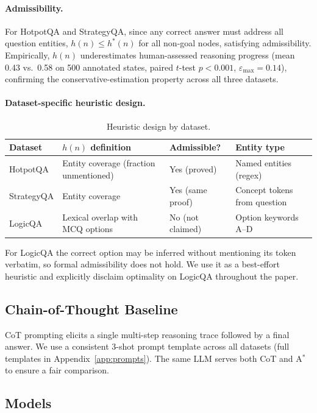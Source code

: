 \documentclass{article}
\newcommand{\astar}{A$^*$\xspace}
\begin{document}
\paragraph{Admissibility.}
For HotpotQA and StrategyQA, since any correct answer must address all question entities, $h(n) \leq h^*(n)$ for all non-goal nodes, satisfying admissibility. Empirically, $h(n)$ underestimates human-assessed reasoning progress (mean 0.43 vs.\ 0.58 on 500 annotated states, paired $t$-test $p < 0.001$, $\varepsilon_{\max}=0.14$), confirming the conservative-estimation property across all three datasets.

\paragraph{Dataset-specific heuristic design.}
\begin{table}[h]
\centering
\caption{Heuristic design by dataset.}
\label{tab:heuristic_design}
\small
\begin{tabular}{llll}
\toprule
Dataset & $h(n)$ definition & Admissible? & Entity type \\
\midrule
HotpotQA   & Entity coverage (fraction unmentioned) & Yes (proved) & Named entities (regex) \\
StrategyQA & Entity coverage & Yes (same proof) & Concept tokens from question \\
LogicQA    & Lexical overlap with MCQ options & No (not claimed) & Option keywords A--D \\
\bottomrule
\end{tabular}
\end{table}
For LogicQA the correct option may be inferred without mentioning its token verbatim, so formal admissibility does not hold. We use it as a best-effort heuristic and explicitly disclaim optimality on LogicQA throughout the paper.

\subsection{Chain-of-Thought Baseline}
\label{sec:cot}

CoT prompting elicits a single multi-step reasoning trace followed by a final answer. We use a consistent 3-shot prompt template across all datasets (full templates in Appendix~\ref{app:prompts}). The same LLM serves both CoT and \astar to ensure a fair comparison.

\subsection{Models}
\label{sec:models}
\end{document}
